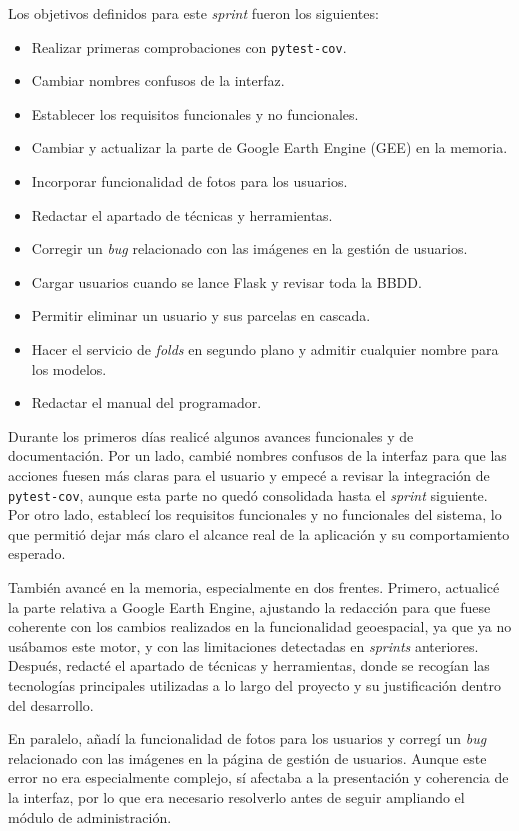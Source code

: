 Los objetivos definidos para este \textit{sprint} fueron los siguientes:
\begin{itemize}
	\item Realizar primeras comprobaciones con \texttt{pytest-cov}.
	\item Cambiar nombres confusos de la interfaz.
	\item Establecer los requisitos funcionales y no funcionales.
	\item Cambiar y actualizar la parte de Google Earth Engine (GEE) en la memoria.
	\item Incorporar funcionalidad de fotos para los usuarios.
	\item Redactar el apartado de técnicas y herramientas.
	\item Corregir un \textit{bug} relacionado con las imágenes en la gestión de usuarios.
	\item Cargar usuarios cuando se lance Flask y revisar toda la BBDD.
	\item Permitir eliminar un usuario y sus parcelas en cascada.
	\item Hacer el servicio de \textit{folds} en segundo plano y admitir cualquier nombre para los modelos.
	\item Redactar el manual del programador.
\end{itemize}

Durante los primeros días realicé algunos avances funcionales y de documentación. Por un lado, cambié nombres confusos de la interfaz para que las acciones fuesen más claras para el usuario y empecé a revisar la integración de \texttt{pytest-cov}, aunque esta parte no quedó consolidada hasta el \textit{sprint} siguiente. Por otro lado, establecí los requisitos funcionales y no funcionales del sistema, lo que permitió dejar más claro el alcance real de la aplicación y su comportamiento esperado.

También avancé en la memoria, especialmente en dos frentes. Primero, actualicé la parte relativa a Google Earth Engine, ajustando la redacción para que fuese coherente con los cambios realizados en la funcionalidad geoespacial, ya que ya no usábamos este motor, y con las limitaciones detectadas en \textit{sprints} anteriores. Después, redacté el apartado de técnicas y herramientas, donde se recogían las tecnologías principales utilizadas a lo largo del proyecto y su justificación dentro del desarrollo.

En paralelo, añadí la funcionalidad de fotos para los usuarios y corregí un \textit{bug} relacionado con las imágenes en la página de gestión de usuarios. Aunque este error no era especialmente complejo, sí afectaba a la presentación y coherencia de la interfaz, por lo que era necesario resolverlo antes de seguir ampliando el módulo de administración.

